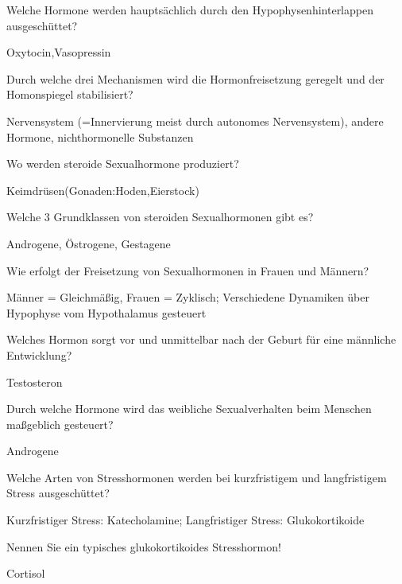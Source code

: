 \documentclass[10pt, a4paper]{exam}
\begin{document}
\begin{questions}
  \question Welche Hormone werden hauptsächlich durch den Hypophysenhinterlappen ausgeschüttet?
  \begin{solution}
    Oxytocin,Vasopressin
  \end{solution}

  \question Durch welche drei Mechanismen wird die Hormonfreisetzung geregelt und der Homonspiegel stabilisiert?
  \begin{solution}
    Nervensystem (=Innervierung meist durch autonomes Nervensystem), andere Hormone, nichthormonelle Substanzen
  \end{solution}

  \question Wo werden steroide Sexualhormone produziert?
  \begin{solution}
    Keimdrüsen(Gonaden:Hoden,Eierstock)
  \end{solution}

  \question Welche 3 Grundklassen von steroiden Sexualhormonen gibt es?
  \begin{solution}
    Androgene, Östrogene, Gestagene
  \end{solution}

  \question Wie erfolgt der Freisetzung von Sexualhormonen in Frauen und Männern?
  \begin{solution}
    Männer = Gleichmäßig, Frauen = Zyklisch; Verschiedene Dynamiken über Hypophyse vom Hypothalamus gesteuert
  \end{solution}

  \question Welches Hormon sorgt vor und unmittelbar nach der Geburt für eine männliche Entwicklung?
  \begin{solution}
    Testosteron
  \end{solution}

  \question Durch welche Hormone wird das weibliche Sexualverhalten beim Menschen maßgeblich gesteuert?
  \begin{solution}
    Androgene
  \end{solution}

  \question Welche Arten von Stresshormonen werden bei kurzfristigem und langfristigem Stress ausgeschüttet?
  \begin{solution}
    Kurzfristiger Stress: Katecholamine; \quad Langfristiger Stress: Glukokortikoide
  \end{solution}

  \question Nennen Sie ein typisches glukokortikoides Stresshormon!
  \begin{solution}
    Cortisol
  \end{solution}


\end{questions}
\end{document}
